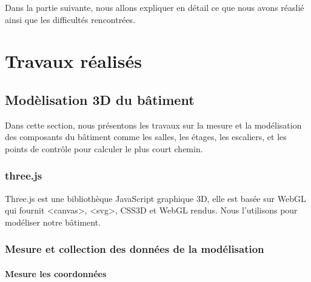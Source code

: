 \documentclass[twoside]{EPURapport}
\begin{document}
\bigskip

Dans la partie suivante, nous allons expliquer en détail ce que nous avons réaslié ainsi que les difficultés rencontrées.


\chapter{Travaux réalisés}

\section{Modèlisation 3D du bâtiment}  
Dans cette section, nous présentons les travaux sur la mesure et la modélisation des composants du bâtiment comme les salles, les étages, les escaliers, et les points de contrôle pour calculer le plus court chemin.  

\subsection{three.js}
Three.js est une bibliothèque JavaScript graphique 3D, elle est basée sur WebGL qui fournit <canvas>, <svg>, CSS3D et WebGL rendus. Nous l'utilisons pour modéliser notre bâtiment.

\subsection{Mesure et collection des données de la modélisation}

\subsubsection{Mesure les coordonnées}
\end{document}
